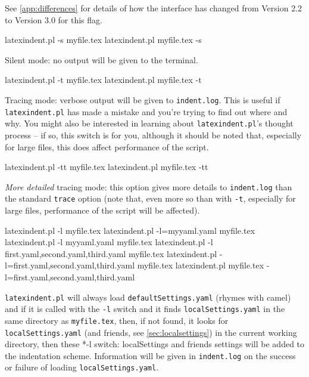	See \vref{app:differences} for details of how the interface has changed from Version 2.2
	to Version 3.0 for this flag.  
	\begin{commandshell}
latexindent.pl -s myfile.tex
latexindent.pl myfile.tex -s
\end{commandshell}

	Silent mode: no output will be given to the terminal.

	\begin{commandshell}
latexindent.pl -t myfile.tex
latexindent.pl myfile.tex -t
\end{commandshell}

	\label{page:traceswitch}
	Tracing mode: verbose output will be given to \texttt{indent.log}. This is useful if
	\texttt{latexindent.pl} has made a mistake and you're trying to find out where and why.
	You might also be interested in learning about \texttt{latexindent.pl}'s thought process
	-- if so, this switch is for you, although it should be noted that, especially for large
	files, this does affect performance of the script.

	\begin{commandshell}
latexindent.pl -tt myfile.tex
latexindent.pl myfile.tex -tt
\end{commandshell}

	\emph{More detailed} tracing mode: this option gives more details to
	\texttt{indent.log}
	than the standard \texttt{trace} option (note that, even more so than with \texttt{-t},
	especially for large files, performance of the script will be affected).

	\begin{commandshell}
latexindent.pl -l myfile.tex
latexindent.pl -l=myyaml.yaml myfile.tex
latexindent.pl -l myyaml.yaml myfile.tex
latexindent.pl -l first.yaml,second.yaml,third.yaml myfile.tex
latexindent.pl -l=first.yaml,second.yaml,third.yaml myfile.tex
latexindent.pl myfile.tex -l=first.yaml,second.yaml,third.yaml 
\end{commandshell}

	\label{page:localswitch}
	\texttt{latexindent.pl} will always load \texttt{defaultSettings.yaml} (rhymes with
	camel) and if it is called with the \texttt{-l} switch and it finds
	\texttt{localSettings.yaml} in the same directory as \texttt{myfile.tex}, then, if not
	found, it looks for \texttt{localSettings.yaml} (and friends, see
	\vref{sec:localsettings}) in the current working directory, then
	these%
	*{-l switch: localSettings and
	friends} settings will be added to the indentation scheme. Information will be given in
	\texttt{indent.log} on the success or failure of loading \texttt{localSettings.yaml}.

